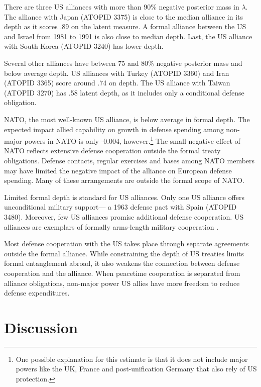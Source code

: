 \documentclass[12pt]{article}
\begin{document}
There are three US alliances with more than 90\% negative posterior mass in $\lambda$. 
The alliance with Japan (ATOPID 3375) is close to the median alliance in its depth as it scores .89 on the latent measure. 
A formal alliance between the US and Israel from 1981 to 1991 is also close to median depth. 
Last, the US alliance with South Korea (ATOPID 3240) has lower depth. 


Several other alliances have between 75 and 80\% negative posterior mass and below average depth. 
US alliances with Turkey (ATOPID 3360) and Iran (ATOPID 3365)  score around .74 on depth. 
The US alliance with Taiwan (ATOPID 3270) has .58 latent depth, as it includes only a conditional defense obligation.  


NATO, the most well-known US alliance, is below average in formal depth. 
The expected impact allied capability on growth in defense spending among non-major powers in NATO is only -0.004, however.\footnote{One possible explanation for this estimate is that it does not include major powers like the UK, France and post-unification Germany that also rely of US protection.}
The small negative effect of NATO reflects extensive defense cooperation outside the formal treaty obligations. 
Defense contacts, regular exercises and bases among NATO members may have limited the negative impact of the alliance on European defense spending. 
Many of these arrangements are outside the formal scope of NATO. 


Limited formal depth is standard for US alliances. 
Only one US alliance offers unconditional military support--- a 1963 defense pact with Spain (ATOPID 3480). 
Moreover, few US alliances promise additional defense cooperation. 
US alliances are exemplars of formally arms-length military cooperation \citep{Lake1996}. 


Most defense cooperation with the US takes place through separate agreements outside the formal alliance. 
While constraining the depth of US treaties limits formal entanglement abroad, it also weakens the connection between defense cooperation and the alliance. 
When peacetime cooperation is separated from alliance obligations, non-major power US allies have more freedom to reduce defense expenditures. 



\section{Discussion}
\end{document}
